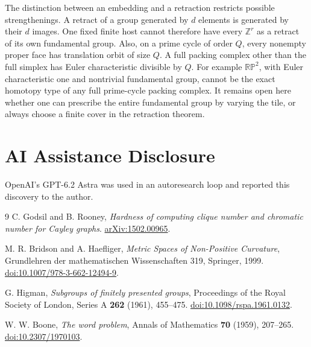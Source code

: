 \documentclass[11pt,letterpaper]{article}
\numberwithin{equation}{section}
\begin{document}
The distinction between an embedding and a retraction restricts possible strengthenings. A
retract of a group generated by \(d\) elements is generated by their \(d\) images. One fixed
finite host cannot therefore have every \(\mathbb Z^r\) as a retract of its own fundamental
group. Also, on a prime cycle of order \(Q\), every nonempty proper face has translation orbit
of size \(Q\). A full packing complex other than the full simplex has Euler characteristic
divisible by \(Q\). For example \(\mathbb{RP}^2\), with Euler characteristic one and
nontrivial fundamental group, cannot be the exact homotopy type of any full prime-cycle
packing complex. It remains open here whether one can prescribe the entire fundamental group
by varying the tile, or always choose a finite cover in the retraction theorem.

\section*{AI Assistance Disclosure}

OpenAI's GPT-6.2 Astra was used in an autoresearch loop and reported this discovery to the author.

\begingroup\small
\begin{thebibliography}{9}
C. Godsil and B. Rooney, \emph{Hardness of computing clique number and chromatic number for
Cayley graphs}. \href{https://arxiv.org/abs/1502.00965}{arXiv:1502.00965}.

M. R. Bridson and A. Haefliger, \emph{Metric Spaces of Non-Positive Curvature}, Grundlehren
der mathematischen Wissenschaften 319, Springer, 1999.
\href{https://doi.org/10.1007/978-3-662-12494-9}{doi:10.1007/978-3-662-12494-9}.

G. Higman, \emph{Subgroups of finitely presented groups}, Proceedings of the Royal Society of
London, Series A \textbf{262} (1961), 455--475.
\href{https://doi.org/10.1098/rspa.1961.0132}{doi:10.1098/rspa.1961.0132}.

W. W. Boone, \emph{The word problem}, Annals of Mathematics \textbf{70} (1959), 207--265.
\href{https://doi.org/10.2307/1970103}{doi:10.2307/1970103}.
\end{thebibliography}
\endgroup
\end{document}
